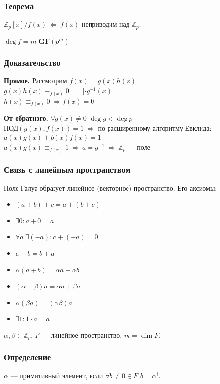 \documentclass[12pt]{article}
\renewcommand{\gcd}{\text{НОД}}
\begin{document}
\subsubsection{Теорема}
$\mathbb{Z}_p[x] / f(x)\ \Leftrightarrow\ f(x)$ неприводим над $\mathbb{Z}_p$.

$\deg f = m$    $\mathbf{GF}(p^m)$
\subsubsection{Доказательство}
\textbf{Прямое.} Рассмотрим $f(x) = g(x)h(x)$ \\
$g(x)h(x) \equiv_{f(x)} 0 \qquad | \cdot g^{-1}(x) $ \\
$h(x) \equiv_{f(x)} 0 |\Rightarrow f(x) = 0$

\textbf{От обратного.} $\forall g(x) \neq 0$ $\deg g < \deg p$ \\
$\gcd(g(x), f(x)) = 1\ \Rightarrow$ по расширенному алгоритму Евклида:\\
$a(x)g(x) + b(x)f(x) = 1$ \\
$a(x)g(x) \equiv_{f(x)} 1\ \Rightarrow\ a = g^{-1} \ \Rightarrow\ \mathbb{Z}_p$ — поле

\subsubsection{Связь с линейным пространством}
Поле Галуа образует линейное (векторное) пространство. Его аксиомы:
\begin{itemize}
    \item $(a + b) + c = a + (b + c)$
    \item $\exists 0 : a + 0 = a$
    \item $\forall a \  \exists(-a) : a + (-a) = 0$
    \item $a + b = b + a$
    \item $\alpha(a + b) = \alpha a + \alpha b$
    \item $(\alpha + \beta)a = \alpha a + \beta a$
    \item $\alpha(\beta a) = (\alpha \beta) a$
    \item $\exists 1 : 1 \cdot a = a$
\end{itemize}

$\alpha, \beta \in \mathbb{Z}_p$, $F$ — линейное пространство. $m = \dim F$.

\subsubsection{Определение}
$\alpha$ — примитивный элемент, если $\forall b \neq 0 \in F$ \qquad $b = \alpha^i$.
\end{document}

